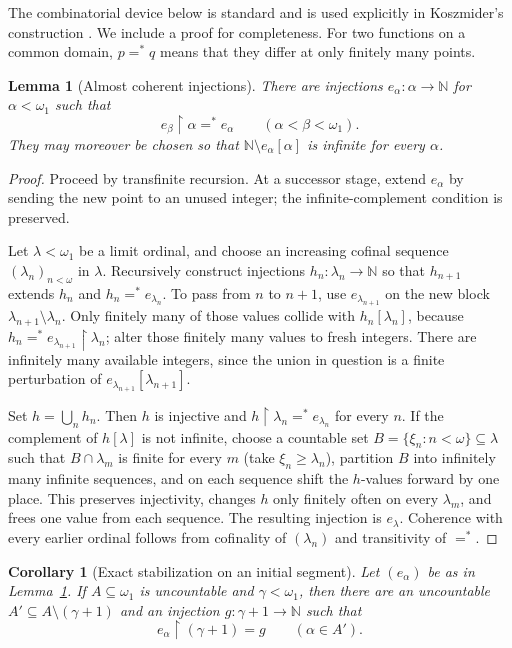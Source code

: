 \documentclass[11pt]{article}
\newtheorem{lemma}[theorem]{Lemma}
\newtheorem{corollary}[theorem]{Corollary}
\theoremstyle{remark}
\newcommand{\N}{\mathbb N}
\newcommand{\eqstar}{=^{*}}
\begin{document}
The combinatorial device below is standard and is used explicitly in
Koszmider's construction \cite[Lemma 9]{Koszmider}.  We include a proof for
completeness.  For two functions on a common domain, $p\eqstar q$ means that
they differ at only finitely many points.

\begin{lemma}[Almost coherent injections]\label{lem:coherent}
There are injections $e_\alpha:\alpha\to\N$ for $\alpha<\omega_1$ such that
\[
  e_\beta\!\upharpoonright\alpha\eqstar e_\alpha
  \qquad(\alpha<\beta<\omega_1).
\]
They may moreover be chosen so that $\N\setminus e_\alpha[\alpha]$ is infinite
for every $\alpha$.
\end{lemma}

\begin{proof}
Proceed by transfinite recursion.  At a successor stage, extend $e_\alpha$ by
sending the new point to an unused integer; the infinite-complement condition
is preserved.

Let $\lambda<\omega_1$ be a limit ordinal, and choose an increasing cofinal
sequence $(\lambda_n)_{n<\omega}$ in $\lambda$.  Recursively construct
injections $h_n:\lambda_n\to\N$ so that $h_{n+1}$ extends $h_n$ and
$h_n\eqstar e_{\lambda_n}$.  To pass from $n$ to $n+1$, use
$e_{\lambda_{n+1}}$ on the new block
$\lambda_{n+1}\setminus\lambda_n$.  Only finitely many of those values collide
with $h_n[\lambda_n]$, because
$h_n\eqstar e_{\lambda_{n+1}}\!\upharpoonright\lambda_n$; alter those finitely
many values to fresh integers.  There are infinitely many available integers,
since the union in question is a finite perturbation of
$e_{\lambda_{n+1}}[\lambda_{n+1}]$.

Set $h=\bigcup_n h_n$.  Then $h$ is injective and
$h\!\upharpoonright\lambda_n\eqstar e_{\lambda_n}$ for every $n$.  If the
complement of $h[\lambda]$ is not infinite, choose a countable set
$B=\{\xi_n:n<\omega\}\subseteq\lambda$ such that
$B\cap\lambda_m$ is finite for every $m$ (take $\xi_n\ge\lambda_n$), partition
$B$ into infinitely many infinite sequences, and on each sequence shift the
$h$-values forward by one place.  This preserves injectivity, changes $h$ only
finitely often on every $\lambda_m$, and frees one value from each sequence.
The resulting injection is $e_\lambda$.  Coherence with every earlier ordinal
follows from cofinality of $(\lambda_n)$ and transitivity of $\eqstar$.
\end{proof}

\begin{corollary}[Exact stabilization on an initial segment]\label{cor:stabilize}
Let $(e_\alpha)$ be as in Lemma~\ref{lem:coherent}.  If
$A\subseteq\omega_1$ is uncountable and $\gamma<\omega_1$, then there are an
uncountable $A'\subseteq A\setminus(\gamma+1)$ and an injection
$g:\gamma+1\to\N$ such that
\[
  e_\alpha\!\upharpoonright(\gamma+1)=g
  \qquad(\alpha\in A').
\]
\end{corollary}
\end{document}
